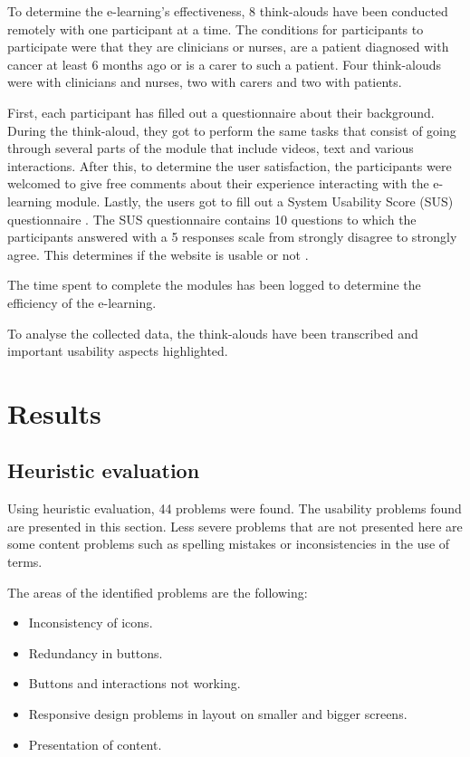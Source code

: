 \documentclass{sigchi}
\begin{document}
To determine the e-learning's effectiveness, 8 think-alouds have been conducted remotely with one participant at a time. The conditions for participants to participate were that they are clinicians or nurses, are a patient diagnosed with cancer at least 6 months ago or is a carer to such a patient. Four think-alouds were with clinicians and nurses, two with carers and two with patients.

First, each participant has filled out a questionnaire about their background. During the think-aloud, they got to perform the same tasks that consist of going through several parts of the module that include videos, text and various interactions. After this, to determine the user satisfaction, the participants were welcomed to give free comments about their experience interacting with the e-learning module. Lastly, the users got to fill out a System Usability Score (SUS) questionnaire \cite{brooke1996sus}. The SUS questionnaire contains 10 questions to which the participants answered with a 5 responses scale from strongly disagree to strongly agree. This determines if the website is usable or not \cite{brooke1996sus}.

The time spent to complete the modules has been logged to determine the efficiency of the e-learning. 

To analyse the collected data, the think-alouds have been transcribed and important usability aspects highlighted. 


\section{Results}
\raggedbottom

\subsection{Heuristic evaluation}
Using heuristic evaluation, 44 problems were found. The usability problems found are presented in this section. Less severe problems that are not presented here are some content problems such as spelling mistakes or inconsistencies in the use of terms. 

The areas of the identified problems are the following:

\begin{itemize}[noitemsep]
    \item Inconsistency of icons.
    \item Redundancy in buttons.
    \item Buttons and interactions not working.
    \item Responsive design problems in layout on smaller and bigger screens.
    \item Presentation of content.
\end{itemize}
\end{document}
